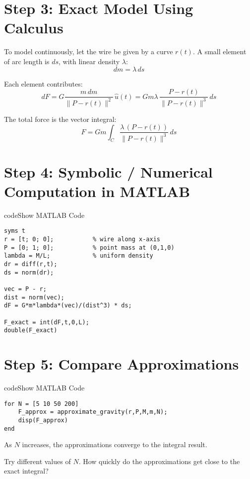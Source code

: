 \documentclass{ximera}
\begin{document}
\section*{Step 3: Exact Model Using Calculus}

To model continuously, let the wire be given by a curve $r(t)$.  
A small element of arc length is $ds$, with linear density $\lambda$:
$$
dm = \lambda \, ds
$$

Each element contributes:
$$
dF = G \frac{m \, dm}{\|P-r(t)\|^2}\,\hat{u}(t)
= G m \lambda \,\frac{P-r(t)}{\|P-r(t)\|^3}\,ds
$$

The total force is the vector integral:
$$
F = G m \int_C \frac{\lambda \,(P-r(t))}{\|P-r(t)\|^3}\,ds
$$

\section*{Step 4: Symbolic / Numerical Computation in MATLAB}

\begin{expandable}{code}{Show MATLAB Code}
\begin{verbatim}
syms t
r = [t; 0; 0];           % wire along x-axis
P = [0; 1; 0];           % point mass at (0,1,0)
lambda = M/L;            % uniform density
dr = diff(r,t);
ds = norm(dr);

vec = P - r;
dist = norm(vec);
dF = G*m*lambda*(vec)/(dist^3) * ds;

F_exact = int(dF,t,0,L);
double(F_exact)
\end{verbatim}
\end{expandable}

\section*{Step 5: Compare Approximations}

\begin{expandable}{code}{Show MATLAB Code}
\begin{verbatim}
for N = [5 10 50 200]
    F_approx = approximate_gravity(r,P,M,m,N);
    disp(F_approx)
end
\end{verbatim}
\end{expandable}

As $N$ increases, the approximations converge to the integral result.

\begin{problem}
Try different values of $N$. How quickly do the approximations get close to the exact integral?  
\end{problem}
\end{document}
